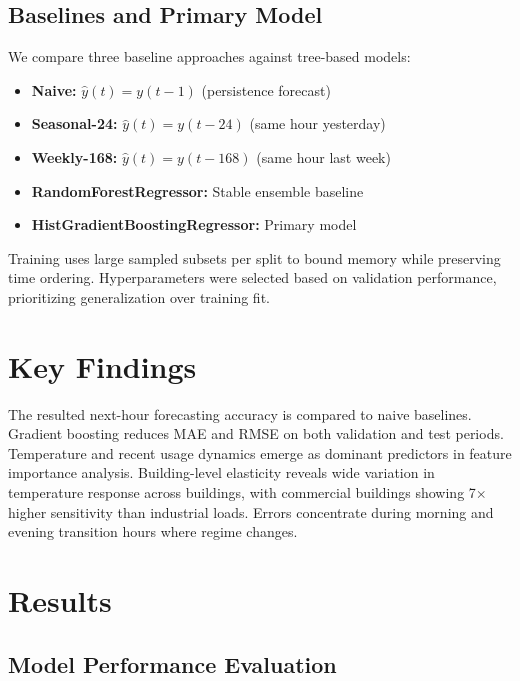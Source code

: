 \documentclass[11pt,a4paper]{article}
\begin{document}
\subsection{Baselines and Primary Model}

We compare three baseline approaches against tree-based models:
\begin{itemize}[leftmargin=*]
  \item \textbf{Naive:} $\hat{y}(t) = y(t-1)$ (persistence forecast)
  \item \textbf{Seasonal-24:} $\hat{y}(t) = y(t-24)$ (same hour yesterday)
  \item \textbf{Weekly-168:} $\hat{y}(t) = y(t-168)$ (same hour last week)
  \item \textbf{RandomForestRegressor:} Stable ensemble baseline
  \item \textbf{HistGradientBoostingRegressor:} Primary model
\end{itemize}

Training uses large sampled subsets per split to bound memory while preserving time ordering. Hyperparameters were selected based on validation performance, prioritizing generalization over training fit.

\section{Key Findings}

The resulted next-hour forecasting accuracy is compared to naive baselines. Gradient boosting reduces MAE and RMSE on both validation and test periods. Temperature and recent usage dynamics emerge as dominant predictors in feature importance analysis. Building-level elasticity reveals wide variation in temperature response across buildings, with commercial buildings showing 7$\times$ higher sensitivity than industrial loads. Errors concentrate during morning and evening transition hours where regime changes.

\section{Results}

\subsection{Model Performance Evaluation}
\end{document}
